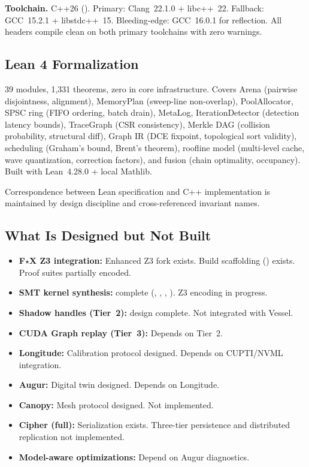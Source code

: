 \textbf{Toolchain.}
C++26 ().
Primary: Clang~22.1.0 + libc++~22.
Fallback: GCC~15.2.1 + libstdc++~15.
Bleeding-edge: GCC~16.0.1 for reflection.
All headers compile clean on both primary toolchains with zero warnings.

\subsection{Lean 4 Formalization}

39 modules, 1,331 theorems, zero  in core infrastructure.
Covers Arena (pairwise disjointness, alignment), MemoryPlan (sweep-line non-overlap), PoolAllocator, SPSC ring (FIFO ordering, batch drain), MetaLog, IterationDetector (detection latency bounds), TraceGraph (CSR consistency), Merkle DAG (collision probability, structural diff), Graph IR (DCE fixpoint, topological sort validity), scheduling (Graham's bound, Brent's theorem), roofline model (multi-level cache, wave quantization, correction factors), and fusion (chain optimality, occupancy).
Built with Lean~4.28.0 + local Mathlib.

Correspondence between Lean specification and C++ implementation is maintained by design discipline and cross-referenced invariant names.

\subsection{What Is Designed but Not Built}

\begin{itemize}
  \item \textbf{F$\star$X Z3 integration:} Enhanced Z3 fork exists. Build scaffolding () exists. Proof suites partially encoded.
  \item \textbf{SMT kernel synthesis:}  complete (, , , ). Z3 encoding in progress.
  \item \textbf{Shadow handles (Tier~2):}  design complete. Not integrated with Vessel.
  \item \textbf{CUDA Graph replay (Tier~3):} Depends on Tier~2.
  \item \textbf{Longitude:} Calibration protocol designed. Depends on CUPTI/NVML integration.
  \item \textbf{Augur:} Digital twin designed. Depends on Longitude.
  \item \textbf{Canopy:} Mesh protocol designed. Not implemented.
  \item \textbf{Cipher (full):} Serialization exists. Three-tier persistence and distributed replication not implemented.
  \item \textbf{Model-aware optimizations:} Depend on Augur diagnostics.
\end{itemize}

